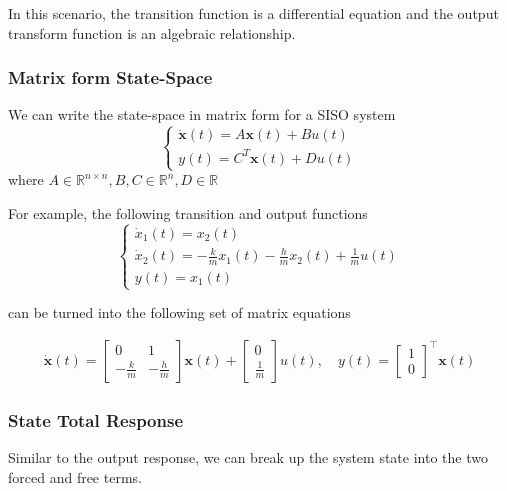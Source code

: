 \documentclass[11pt]{article}
\begin{document}
In this scenario, the transition function is a differential equation and the output transform function is an algebraic relationship.

\subsubsection{Matrix form State-Space}

We can write the state-space in matrix form for a SISO system
\begin{equation}
  \begin{cases}
    \dot{\textbf{x}}(t) = A \textbf{x}(t) + B u(t) \\
    y(t) = C^T \textbf{x} (t) + D u(t)
  \end{cases}
\end{equation}
where $A \in \mathbb{R}^{n \times n}, B, C \in \mathbb{R}^n, D \in \mathbb{R}$

For example, the following transition and output functions
\begin{equation}
  \begin{cases}
    \dot{x}_1 (t) = x_2 (t) \\
    \dot{x}_2 (t) = -\frac{k}{m} x_1 (t) - \frac{h}{m} x_2 (t) + \frac{1}{m} u(t) \\
    y(t) = x_1 (t)
  \end{cases}
\end{equation}

can be turned into the following set of matrix equations


\begin{align}
  \dot{\textbf{x}} (t) = 
  \begin{bmatrix}
      0 & 1 \\ - \frac{k}{m} & - \frac{h}{m}
  \end{bmatrix}
  \textbf{x} (t)
  +
  \begin{bmatrix}
    0 \\ \frac{1}{m}
  \end{bmatrix}
  u(t)
  , \quad
  y(t) =
  \begin{bmatrix}
    1 \\ 0
  \end{bmatrix}^\top 
  \textbf{x}(t)
\end{align}

\subsubsection{State Total Response}
Similar to the output response, we can break up the system state into the two forced and free terms.
\end{document}
